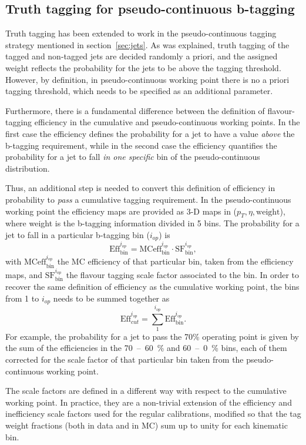 \subsection{Truth tagging for pseudo-continuous b-tagging}
\label{app:truth-tag-pcbt}
Truth tagging has been extended to work in the pseudo-continuous tagging
strategy mentioned in section~\ref{sec:jets}. As was explained, truth tagging of
the tagged and non-tagged jets are decided randomly a priori, and the assigned
weight reflects the probability for the jets to be above the tagging threshold.
However, by definition, in pseudo-continuous working point there is no a priori
tagging threshold, which needs to be specified as an additional parameter.

Furthermore, there is a fundamental difference between the definition of
flavour-tagging efficiency in the cumulative and pseudo-continuous working
points. In the first case the efficiency defines the probability for a jet to
have a value \textit{above} the b-tagging requirement, while in the second case
the efficiency quantifies the probability for a jet to fall \textit{in one
  specific} bin of the pseudo-continuous distribution.

 Thus, an additional step is needed to convert this definition of efficiency in
 probability to \textit{pass} a cumulative tagging requirement.  In the
 pseudo-continuous working point the efficiency maps are provided as 3-D maps in
 ($p_T, \eta, \text{weight}$), where weight is the b-tagging information divided
 in 5 bins. The probability for a jet to fall in a particular b-tagging
 bin ($i_{op}$) is
 \begin{equation}
   \text{Eff}_{\text{bin}}^{i_{op}} = \text{MCeff}_{\text{bin}}^{i_{op}} \cdot \text{SF}_{\text{bin}}^{i_{op}},
 \end{equation}
 with $\text{MCeff}_{\text{bin}}^{i_{op}}$ the MC efficiency of that particular
 bin, taken from the efficiency maps, and $\text{SF}_{\text{bin}}^{i_{op}}$ the
 flavour tagging scale factor associated to the bin. In order to recover the
 same definition of efficiency as the cumulative working point, the bins from 1
 to $i_{op}$ needs to be summed together as
 \begin{equation}
   \text{Eff}_{cut}^{i_{op}} = \sum_1^{i_{op}} \text{Eff}_{\text{bin}}^{i_{op}}.
 \end{equation}
 For example, the probability for a jet to pass the 70\% operating point is
 given by the sum of the efficiencies in the 70~--~60~\% and 60~--~0~\% bins,
 each of them corrected for the scale factor of that particular bin taken from
 the pseudo-continuous working point.
 
 The scale factors are defined in a different way with respect to the cumulative
 working point. In practice, they are a non-trivial extension of the efficiency
 and inefficiency scale factors used for the regular calibrations, modified so
 that the tag weight fractions (both in data and in MC) sum up to unity for each
 kinematic bin.
